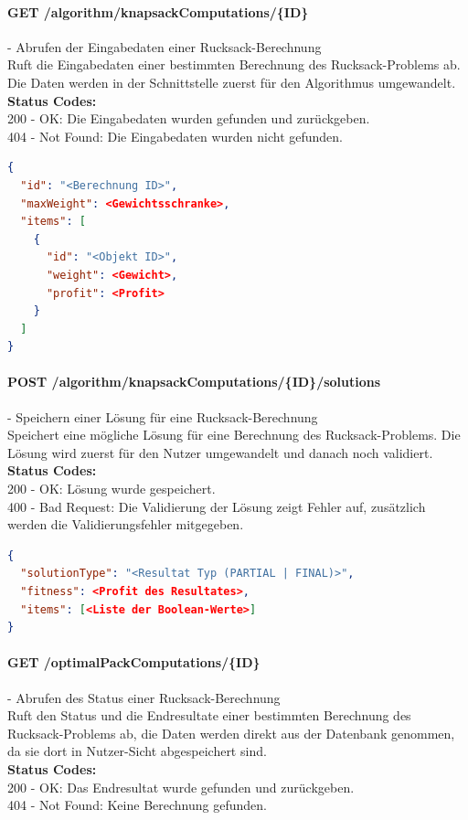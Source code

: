 \paragraph{GET /algorithm/knapsackComputations/\{ID\}} - Abrufen der Eingabedaten einer Rucksack-Berechnung\mbox{}\\
Ruft die Eingabedaten einer bestimmten Berechnung des Rucksack-Problems ab. Die Daten werden in der Schnittstelle zuerst für den Algorithmus umgewandelt.\\
\textbf{Status Codes:}\\
200 - OK: Die Eingabedaten wurden gefunden und zurückgeben.\\
404 - Not Found: Die Eingabedaten wurden nicht gefunden.\\

\begin{lstlisting}[language=JSON, caption=Beispiel für Eingabedaten des Rucksack-Problems für den Algorithmus, label=lst:input_knapsack_algo]  
{
  "id": "<Berechnung ID>",
  "maxWeight": <Gewichtsschranke>,
  "items": [
    {
      "id": "<Objekt ID>",
      "weight": <Gewicht>,
      "profit": <Profit>
    }
  ]
}
\end{lstlisting}

\paragraph{POST /algorithm/knapsackComputations/\{ID\}/solutions} - Speichern einer Lösung für eine Rucksack-Berechnung\mbox{}\\
Speichert eine mögliche Lösung für eine Berechnung des Rucksack-Problems. Die Lösung wird zuerst für den Nutzer umgewandelt und danach noch validiert.\\
\textbf{Status Codes:}\\
200 - OK: Lösung wurde gespeichert.\\
400 - Bad Request: Die Validierung der Lösung zeigt Fehler auf, zusätzlich werden die Validierungsfehler mitgegeben.\\

\begin{lstlisting}[language=JSON, caption=Beispiel eines Resultates für das Rucksack-Problem aus Algorithmus-Sicht, label=lst:solution_knapsack_algo]  
{
  "solutionType": "<Resultat Typ (PARTIAL | FINAL)>",
  "fitness": <Profit des Resultates>,
  "items": [<Liste der Boolean-Werte>]
}
\end{lstlisting}

\paragraph{GET /optimalPackComputations/\{ID\}} - Abrufen des Status einer Rucksack-Berechnung\mbox{}\\
Ruft den Status und die Endresultate einer bestimmten Berechnung des Rucksack-Problems ab, die Daten werden direkt aus der Datenbank genommen, da sie dort in Nutzer-Sicht abgespeichert sind.\\
\textbf{Status Codes:}\\
200 - OK: Das Endresultat wurde gefunden und zurückgeben.\\
404 - Not Found: Keine Berechnung gefunden.\\


